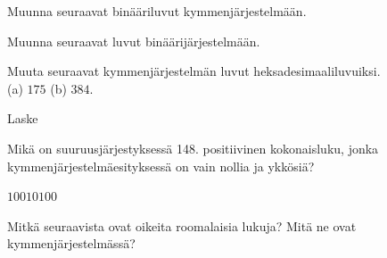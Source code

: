 \begin{tehtavasivu}

\begin{tehtava}
Muunna seuraavat binääriluvut kymmenjärjestelmään.
\begin{vastaus}
\end{vastaus}
\end{tehtava}

\begin{tehtava}
Muunna seuraavat luvut binäärijärjestelmään.
\begin{vastaus}
\end{vastaus}
\end{tehtava}
\begin{tehtava}
Muuta seuraavat kymmenjärjestelmän luvut heksadesimaaliluvuiksi. \\
	(a) $175$ \qquad
	(b) $384$.

\end{tehtava}

\begin{tehtava}
	Laske
	\begin{vastaus}
	\end{vastaus}
\end{tehtava}

\begin{tehtava}
	Mikä on suuruusjärjestyksessä 148. positiivinen kokonaisluku, jonka kymmenjärjestelmäesityksessä on vain nollia ja ykkösiä?
	\begin{vastaus}
		$10010100$
	\end{vastaus}
\end{tehtava}

\begin{tehtava}
Mitkä seuraavista ovat oikeita roomalaisia lukuja? Mitä ne ovat kymmenjärjestelmässä?
\begin{vastaus}
\end{vastaus}
\end{tehtava}


\end{tehtavasivu}
